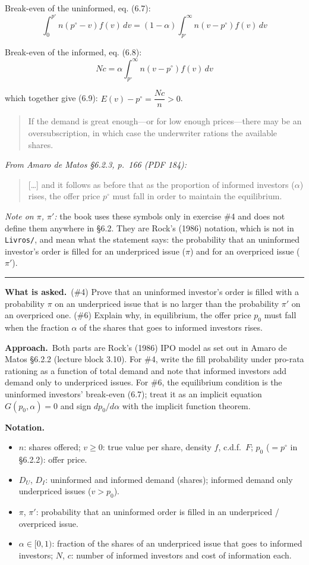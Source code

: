 \documentclass[11pt,a4paper]{article}
\newcommand{\notation}{\par\noindent\textbf{Notation.}}
\newcommand{\asked}{\par\medskip\noindent\textbf{What is asked.}~}
\newcommand{\approach}{\par\smallskip\noindent\textbf{Approach.}~}
\newcommand{\stmtend}{\par\endgroup\nopagebreak\noindent\rule{\linewidth}{0.4pt}\par\medskip}
\begin{document}
Break-even of the uninformed, eq. (6.7):
\[\int_0^{p^\circ} n(p^\circ - v)f(v)\,dv = (1-\alpha)\int_{p^\circ}^{\infty} n(v - p^\circ)f(v)\,dv\]

Break-even of the informed, eq. (6.8): \[Nc = \alpha\int_{p^\circ}^{\infty} n(v - p^\circ)f(v)\,dv\]

which together give (6.9): \(E(v) - p^\circ = \dfrac{Nc}{n} > 0\).

\begin{quote}
If the demand is great enough---or for low enough prices---there may be an oversubscription, in
which case the underwriter rations the available shares.
\end{quote}

\emph{From Amaro de Matos §6.2.3, p.~166 (PDF 184):}

\begin{quote}
{[}\ldots{]} and it follows as before that as the proportion of informed investors (\(\alpha\))
rises, the offer price \(p^\circ\) must fall in order to maintain the equilibrium.
\end{quote}

\emph{Note on \(\pi\), \(\pi'\):} the book uses these symbols only in exercise \#4 and does not
define them anywhere in §6.2. They are Rock's (1986) notation, which is not in \texttt{Livros/}, and
mean what the statement says: the probability that an uninformed investor's order is filled for an
underpriced issue (\(\pi\)) and for an overpriced issue (\(\pi'\)).
\stmtend

\asked (\#4) Prove that an uninformed investor's order is filled with a probability $\pi$ on an underpriced issue that is no larger than the probability $\pi'$ on an overpriced one. (\#6) Explain why, in equilibrium, the offer price $p_0$ must fall when the fraction $\alpha$ of the shares that goes to informed investors rises.

\approach Both parts are Rock's (1986) IPO model as set out in Amaro de Matos \S6.2.2 (lecture block 3.10). For \#4, write the fill probability under pro-rata rationing as a function of total demand and note that informed investors add demand only to underpriced issues. For \#6, the equilibrium condition is the uninformed investors' break-even (6.7); treat it as an implicit equation $G(p_0,\alpha)=0$ and sign $dp_0/d\alpha$ with the implicit function theorem.

\notation
\begin{itemize}
  \item $n$: shares offered; $v\ge0$: true value per share, density $f$, c.d.f.\ $F$; $p_0$ ($=p^\circ$ in \S6.2.2): offer price.
  \item $D_U$, $D_I$: uninformed and informed demand (shares); informed demand only underpriced issues ($v>p_0$).
  \item $\pi$, $\pi'$: probability that an uninformed order is filled in an underpriced / overpriced issue.
  \item $\alpha\in[0,1)$: fraction of the shares of an underpriced issue that goes to informed investors; $N$, $c$: number of informed investors and cost of information each.
\end{itemize}
\end{document}
